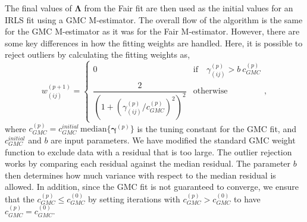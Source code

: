 The final values of $\bm{\Lambda}$ from the Fair fit are then used as the initial values for an IRLS fit using a GMC M-estimator.
The overall flow of the algorithm is the same for the GMC M-estimator as it was for the Fair M-estimator.
However, there are some key differences in how the fitting weights are handled.
Here, it is possible to reject outliers by calculating the fitting weights as,
\begin{equation}
  w_{(ij)}^{(p+1)} =
\begin{cases}
0 & \text{if} \quad \gamma_{(ij)}^{(p)} > b \ c_{GMC}^{(p)} \\
 \dfrac{2}{(1+(\gamma_{(ij)}^{(p)} / c_{GMC}^{(p)})^2)^2} & \text{otherwise}
\end{cases},
\end{equation}
where $c_{GMC}^{(p)} = c_{GMC}^{initial} \, \textrm{median}\{ \bm{\gamma}^{(p)} \}$ is the tuning constant for the GMC fit, and $c_{GMC}^{initial}$ and $b$ are input parameters.
We have modified the standard GMC weight function to exclude data with a residual that is too large.
The outlier rejection works by comparing each residual against the median residual.
The parameter $b$ then determines how much variance with respect to the median residual is allowed.
In addition, since the GMC fit is not guaranteed to converge, we ensure that the $c_{GMC}^{(p)} \leq c_{GMC}^{(0)}$ by setting iterations with $c_{GMC}^{(p)} > c_{GMC}^{(0)}$ to have $c_{GMC}^{(p)} = c_{GMC}^{(0)}$.

